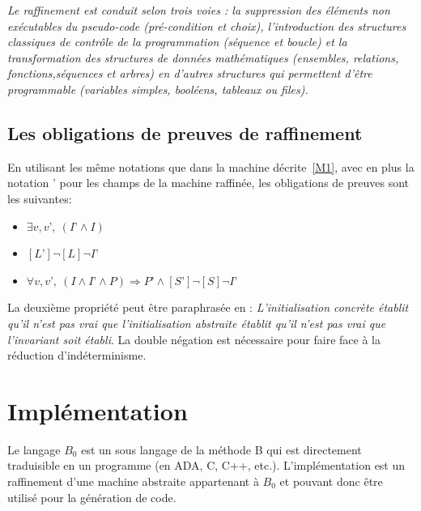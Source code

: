 \documentclass[10pt,a4paper]{article}
\begin{document}
{\emph{Le raffinement est conduit selon trois voies : la suppression des éléments non exécutables du pseudo-code (pré-condition et choix), l'introduction des structures classiques de contrôle de la programmation (séquence et boucle) et la transformation des structures de données mathématiques (ensembles, relations, fonctions,séquences et arbres) en d’autres structures qui permettent d’être programmable (variables simples, booléens, tableaux ou files).}\cite{dossierTechnique}

\subsection{Les obligations de preuves de raffinement}

En utilisant les même notations que dans la machine décrite~\cref{M1}, avec en plus la notation ' pour les champs de la machine raffinée, les obligations de preuves sont les suivantes:
\begin{itemize}
\item $\exists v,v’,~ (I’ \wedge I) $
\item $[L’]\lnot[L]\lnot I’$
\item $\forall v,v’,~ (I \wedge I’ \wedge P) \Rightarrow P’ \wedge [S’]\lnot[S]\lnot I’$
\end{itemize}

La deuxième propriété peut être paraphrasée en : \emph{L'initialisation concrète établit qu'il n'est pas vrai que l'initialisation abstraite établit qu'il n'est pas vrai que l'invariant soit établi}\cite{habrias2006specifications}. La double négation est nécessaire pour faire face à la réduction d'indéterminisme.
\section{Implémentation}

Le langage $B_0$ est un sous langage de la méthode B qui est directement traduisible en un programme (en ADA, C, C++, etc.).
L'implémentation est un raffinement d'une machine abstraite appartenant à $B_0$ et pouvant donc être utilisé pour la génération de code.\\

}
\end{document}
